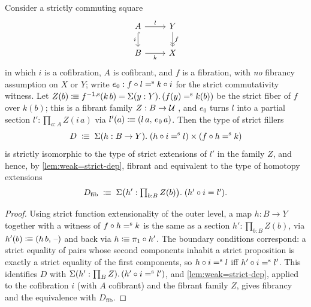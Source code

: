\begin{longversion}
\begin{lemma*}\label{lem:weak=strict-fib}
	Consider a strictly commuting square
	\begin{equation}
		\begin{tikzcd}
			A \ar[r,"l"] \ar[d,hookrightarrow,"i"'] & Y \ar[d,->>,"f"] \\
			B \ar[r,"k"'] & X
		\end{tikzcd}
	\end{equation}
	in which $i$ is a cofibration, $A$ is cofibrant, and $f$ is a fibration, with
	\emph{no} fibrancy assumption on $X$ or $Y$; write
	$e_0 : f \circ l \mathrel{=^\textup{s}} k \circ i$ for the strict commutativity witness.
	Let $Z(b) \mathrel{\vcentcolon\mspace{-1mu}\equiv} {f}^{-1, \textup{s}} (k\,b) = \Sigma(y:Y).\,(f(y)\mathrel{=^\textup{s}} k(b))$
	be the strict fiber of $f$ over $k(b)$; this is a fibrant family $Z : B \to \mathcal{U}$
	\citep[Lem.~3.9]{2LTT}, and $e_0$ turns $l$ into a partial section
	$l' : \prod_{a:A} Z(i\,a)$ via $l'(a) \mathrel{\vcentcolon\mspace{-1mu}\equiv} (l\,a,\,e_0\,a)$.
	Then the type of strict fillers
	\[
		D \;\mathrel{\vcentcolon\mspace{-1mu}\equiv}\; \Sigma(h : B \to Y).\;(h \circ i \mathrel{=^\textup{s}} l) \times (f \circ h \mathrel{=^\textup{s}} k)
	\]
	is strictly isomorphic to the type of strict extensions of $l'$ in the family
	$Z$, and hence, by \cref{lem:weak=strict-dep}, fibrant and equivalent to the
	type of homotopy extensions
	\[
		D_{\mathrm{fib}} \;\mathrel{\vcentcolon\mspace{-1mu}\equiv}\; \Sigma\bigl(h' : \textstyle\prod_{b:B} Z(b)\bigr).\;(h' \circ i = l').
	\]
\end{lemma*}

\begin{proof}
	Using strict function extensionality of the outer level, a map $h : B \to Y$
	together with a witness of $f \circ h \mathrel{=^\textup{s}} k$ is the same as a section
	$h' : \prod_{b:B} Z(b)$, via $h'(b) \mathrel{\vcentcolon\mspace{-1mu}\equiv} (h\,b,\,\text{--})$ and back via
	$h \mathrel{\vcentcolon\mspace{-1mu}\equiv} \pi_1 \circ h'$. The boundary conditions correspond: a strict
	equality of pairs whose second components inhabit a strict proposition is
	exactly a strict equality of the first components, so $h \circ i \mathrel{=^\textup{s}} l$ iff
	$h' \circ i \mathrel{=^\textup{s}} l'$. This identifies $D$ with
	$\Sigma(h' : \prod_B Z).\,(h' \circ i \mathrel{=^\textup{s}} l')$, and
	\cref{lem:weak=strict-dep}, applied to the cofibration $i$ (with $A$
	cofibrant) and the fibrant family $Z$, gives fibrancy and the equivalence with
	$D_{\mathrm{fib}}$.
\end{proof}


\end{longversion}
